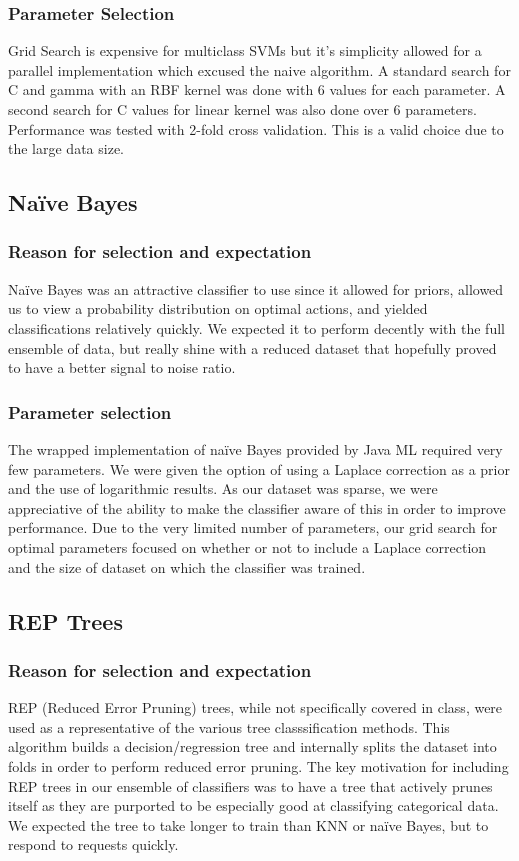 \documentclass[]{article}   %
\begin{document}
\subsubsection{Parameter Selection}
Grid Search is expensive for multiclass SVMs but it's simplicity allowed for a parallel implementation which excused the naive algorithm.  A standard search for C and gamma with an RBF kernel was done with 6 values for each parameter. A second search for C values for linear kernel was also done over 6 parameters.  Performance was tested with 2-fold cross validation. This is a valid choice due to the large data size.


\subsection{Na\"{i}ve Bayes}
\subsubsection{Reason for selection and expectation}
Na\"{i}ve Bayes was an attractive classifier to use since it allowed for priors, allowed us to view a probability 
distribution on optimal actions, and yielded classifications relatively quickly. We expected it to perform decently 
with the full ensemble of data, but really shine with a reduced dataset that hopefully proved to have a better 
signal to noise ratio. 

\subsubsection{Parameter selection}
The wrapped implementation of na\"{i}ve Bayes provided by Java ML required very few parameters. We were given the 
option of using a Laplace correction as a prior and the use of logarithmic results. As our dataset was sparse, we 
were appreciative of the ability to make the classifier aware of this in order to improve performance. Due to the 
very limited number of parameters, our grid search for optimal parameters focused on whether or not to include a 
Laplace correction and the size of dataset on which the classifier was trained. 

\subsection{REP Trees}
\subsubsection{Reason for selection and expectation}
REP (Reduced Error Pruning) trees, while not specifically covered in class, were used as a representative of the 
various tree classsification methods. This algorithm builds a decision/regression tree and internally splits the 
dataset into folds in order to perform reduced error pruning. The key motivation for including REP trees in our 
ensemble of classifiers was to have a tree that actively prunes itself as they are purported to be especially good 
at classifying categorical data. We expected the tree to take longer to train than KNN or na\"{i}ve Bayes, but to 
respond to requests quickly.
\end{document}

